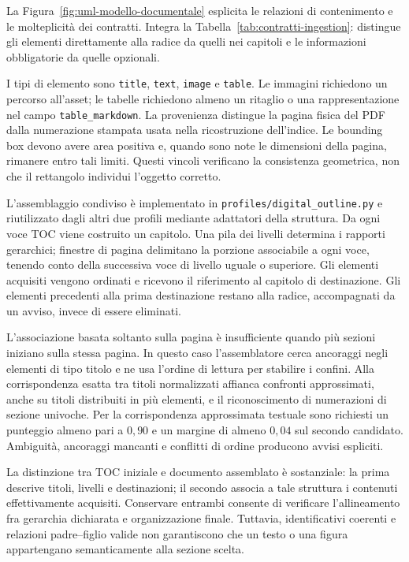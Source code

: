 La Figura~\ref{fig:uml-modello-documentale} esplicita le relazioni di contenimento e le molteplicità dei contratti. Integra la Tabella~\ref{tab:contratti-ingestion}: distingue gli elementi direttamente alla radice da quelli nei capitoli e le informazioni obbligatorie da quelle opzionali.



I tipi di elemento sono \texttt{title}, \texttt{text}, \texttt{image} e \texttt{table}. Le immagini richiedono un percorso all'asset; le tabelle richiedono almeno un ritaglio o una rappresentazione nel campo \texttt{table\_markdown}. La provenienza distingue la pagina fisica del PDF dalla numerazione stampata usata nella ricostruzione dell'indice. Le bounding box devono avere area positiva e, quando sono note le dimensioni della pagina, rimanere entro tali limiti. Questi vincoli verificano la consistenza geometrica, non che il rettangolo individui l'oggetto corretto.

L'assemblaggio condiviso è implementato in \texttt{profiles/digital\_outline.py} e riutilizzato dagli altri due profili mediante adattatori della struttura. Da ogni voce TOC viene costruito un capitolo. Una pila dei livelli determina i rapporti gerarchici; finestre di pagina delimitano la porzione associabile a ogni voce, tenendo conto della successiva voce di livello uguale o superiore. Gli elementi acquisiti vengono ordinati e ricevono il riferimento al capitolo di destinazione. Gli elementi precedenti alla prima destinazione restano alla radice, accompagnati da un avviso, invece di essere eliminati.

L'associazione basata soltanto sulla pagina è insufficiente quando più sezioni iniziano sulla stessa pagina. In questo caso l'assemblatore cerca ancoraggi negli elementi di tipo titolo e ne usa l'ordine di lettura per stabilire i confini. Alla corrispondenza esatta tra titoli normalizzati affianca confronti approssimati, anche su titoli distribuiti in più elementi, e il riconoscimento di numerazioni di sezione univoche. Per la corrispondenza approssimata testuale sono richiesti un punteggio almeno pari a $0{,}90$ e un margine di almeno $0{,}04$ sul secondo candidato. Ambiguità, ancoraggi mancanti e conflitti di ordine producono avvisi espliciti.

La distinzione tra TOC iniziale e documento assemblato è sostanziale: la prima descrive titoli, livelli e destinazioni; il secondo associa a tale struttura i contenuti effettivamente acquisiti. Conservare entrambi consente di verificare l'allineamento fra gerarchia dichiarata e organizzazione finale. Tuttavia, identificativi coerenti e relazioni padre--figlio valide non garantiscono che un testo o una figura appartengano semanticamente alla sezione scelta.

